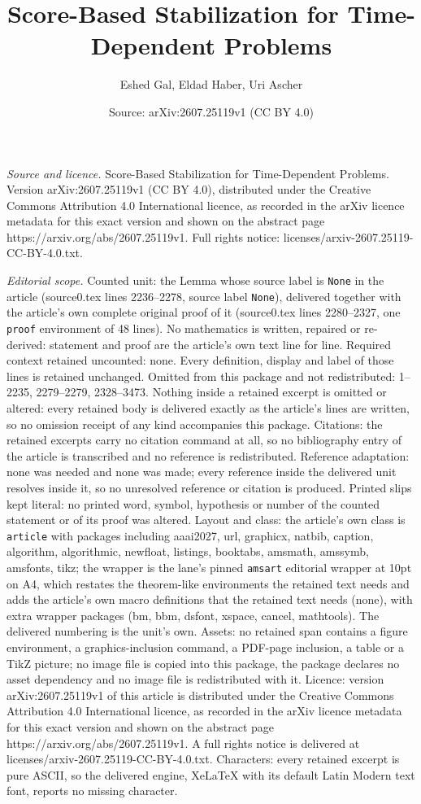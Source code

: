 \documentclass[10pt,a4paper]{amsart}
\title[Score-Based Stabilization for Time-Dependent Problems]{Score-Based Stabilization for Time-Dependent Problems}
\author{Eshed Gal, Eldad Haber, Uri Ascher}
\date{Source: arXiv:2607.25119v1 (CC BY 4.0)}
\begin{document}
\maketitle

\noindent\emph{Source and licence.} Score-Based Stabilization for Time-Dependent Problems. Version arXiv:2607.25119v1 (CC BY 4.0), distributed under the Creative Commons Attribution 4.0 International licence, as recorded in the arXiv licence metadata for this exact version and shown on the abstract page https://arxiv.org/abs/2607.25119v1. Full rights notice: licenses/arxiv-2607.25119-CC-BY-4.0.txt.\par\smallskip

\noindent\textit{Editorial scope.} Counted unit: the Lemma whose source label is \texttt{None} in the article (source0.tex lines 2236--2278, source label \texttt{None}), delivered together with the article's own complete original proof of it (source0.tex lines 2280--2327, one \texttt{proof} environment of 48 lines). No mathematics is written, repaired or re-derived: statement and proof are the article's own text line for line. Required context retained uncounted: none. Every definition, display and label of those lines is retained unchanged. Omitted from this package and not redistributed: 1--2235, 2279--2279, 2328--3473. Nothing inside a retained excerpt is omitted or altered: every retained body is delivered exactly as the article's lines are written, so no omission receipt of any kind accompanies this package. Citations: the retained excerpts carry no citation command at all, so no bibliography entry of the article is transcribed and no reference is redistributed. Reference adaptation: none was needed and none was made; every reference inside the delivered unit resolves inside it, so no unresolved reference or citation is produced. Printed slips kept literal: no printed word, symbol, hypothesis or number of the counted statement or of its proof was altered. Layout and class: the article's own class is \texttt{article} with packages including aaai2027, url, graphicx, natbib, caption, algorithm, algorithmic, newfloat, listings, booktabs, amsmath, amssymb, amsfonts, tikz; the wrapper is the lane's pinned \texttt{amsart} editorial wrapper at 10pt on A4, which restates the theorem-like environments the retained text needs and adds the article's own macro definitions that the retained text needs (none), with extra wrapper packages (bm, bbm, dsfont, xspace, cancel, mathtools). The delivered numbering is the unit's own. Assets: no retained span contains a figure environment, a graphics-inclusion command, a PDF-page inclusion, a table or a TikZ picture; no image file is copied into this package, the package declares no asset dependency and no image file is redistributed with it. Licence: version arXiv:2607.25119v1 of this article is distributed under the Creative Commons Attribution 4.0 International licence, as recorded in the arXiv licence metadata for this exact version and shown on the abstract page https://arxiv.org/abs/2607.25119v1. A full rights notice is delivered at licenses/arxiv-2607.25119-CC-BY-4.0.txt. Characters: every retained excerpt is pure ASCII, so the delivered engine, XeLaTeX with its default Latin Modern text font, reports no missing character.
\end{document}
